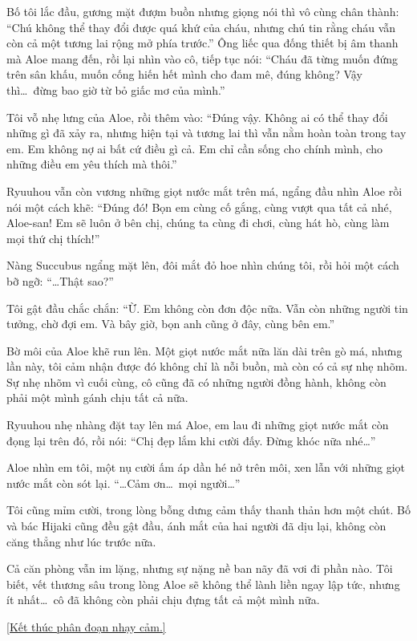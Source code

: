 \documentclass[../main.tex]{subfiles}
\begin{document}
Bố tôi lắc đầu, gương mặt đượm buồn nhưng giọng nói thì vô cùng chân thành: ``Chú không thể thay đổi được quá khứ của cháu, nhưng chú tin rằng cháu vẫn còn cả một tương lai rộng mở phía trước.'' Ông liếc qua đống thiết bị âm thanh mà Aloe mang đến, rồi lại nhìn vào cô, tiếp tục nói: ``Cháu đã từng muốn đứng trên sân khấu, muốn cống hiến hết mình cho đam mê, đúng không? Vậy thì\dots\ đừng bao giờ từ bỏ giấc mơ của mình.''

Tôi vỗ nhẹ lưng của Aloe, rồi thêm vào: ``Đúng vậy. Không ai có thể thay đổi những gì đã xảy ra, nhưng hiện tại và tương lai thì vẫn nằm hoàn toàn trong tay em. Em không nợ ai bất cứ điều gì cả. Em chỉ cần sống cho chính mình, cho những điều em yêu thích mà thôi.''

Ryuuhou vẫn còn vương những giọt nước mắt trên má, ngẩng đầu nhìn Aloe rồi nói một cách khẽ: ``Đúng đó! Bọn em cùng cố gắng, cùng vượt qua tất cả nhé, Aloe-san! Em sẽ luôn ở bên chị, chúng ta cùng đi chơi, cùng hát hò, cùng làm mọi thứ chị thích!''

Nàng Succubus ngẩng mặt lên, đôi mắt đỏ hoe nhìn chúng tôi, rồi hỏi một cách bỡ ngỡ: ``\dots Thật sao?''

Tôi gật đầu chắc chắn: ``Ừ. Em không còn đơn độc nữa. Vẫn còn những người tin tưởng, chờ đợi em. Và bây giờ, bọn anh cũng ở đây, cùng bên em.''

Bờ môi của Aloe khẽ run lên. Một giọt nước mắt nữa lăn dài trên gò má, nhưng lần này, tôi cảm nhận được đó không chỉ là nỗi buồn, mà còn có cả sự nhẹ nhõm. Sự nhẹ nhõm vì cuối cùng, cô cũng đã có những người đồng hành, không còn phải một mình gánh chịu tất cả nữa.

Ryuuhou nhẹ nhàng đặt tay lên má Aloe, em lau đi những giọt nước mắt còn đọng lại trên đó, rồi nói: ``Chị đẹp lắm khi cười đấy. Đừng khóc nữa nhé\dots''

Aloe nhìn em tôi, một nụ cười ấm áp dần hé nở trên môi, xen lẫn với những giọt nước mắt còn sót lại. ``\dots Cảm ơn\dots\ mọi người\dots''

Tôi cũng mỉm cười, trong lòng bỗng dưng cảm thấy thanh thản hơn một chút. Bố và bác Hijaki cũng đều gật đầu, ánh mắt của hai người đã dịu lại, không còn căng thẳng như lúc trước nữa.

Cả căn phòng vẫn im lặng, nhưng sự nặng nề ban nãy đã vơi đi phần nào. Tôi biết, vết thương sâu trong lòng Aloe sẽ không thể lành liền ngay lập tức, nhưng ít nhất\dots\ cô đã không còn phải chịu đựng tất cả một mình nữa.

\begin{center}
  \uline{[Kết thúc phân đoạn nhạy cảm.]}
\end{center}
\end{document}
